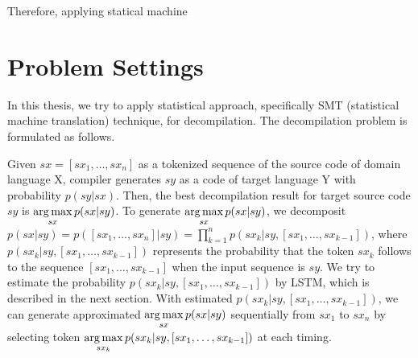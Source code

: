 \documentclass[senior,final,11pt]{iscs-thesis}
\newcommand{\argmax}{\mathop{\rm arg\,max}\limits}
\begin{document}
Therefore, applying statical machine 
















\section{Problem Settings}

In this thesis, we try to apply statistical approach, specifically SMT (statistical machine translation) technique, for decompilation.
The decompilation problem is formulated as follows. 

Given $sx = [sx_1, \dots, sx_n] $ as a tokenized sequence of the source code of domain language X, compiler generates $sy$ as a code of target language Y with probability $p(sy|sx)$.
Then, the best decompilation result for target source code $sy$ is $ \argmax_{sx} p(sx|sy)$. 
To generate $ \argmax_{sx} p(sx|sy)$, we decomposit $ p(sx|sy) = p([sx_1, \dots, sx_n] |sy) = \prod_{k=1}^{n} p(sx_k|sy,[sx_1,\dots,sx_{k-1}]) $,
where $ p(sx_k|sy,[sx_1,\dots,sx_{k-1}]) $ represents the probability that the token $ sx_k $ follows to the sequence $ [sx_1,\dots,sx_{k-1}] $ 
when the input sequence is $ sy $. 
We try to estimate the probability $ p(sx_k|sy,[sx_1,\dots,sx_{k-1}]) $ by LSTM, which is described in the next section.
With estimated $ p(sx_k|sy,[sx_1,\dots,sx_{k-1}]) $, we can generate approximated $ \argmax_{sx} p(sx|sy)$ sequentially from $sx_1$ to $sx_n$ by selecting token $ \argmax_{sx_{k}} p(sx_k|sy,[sx_1,\dots,sx_{k-1}]) $ at each timing.
\end{document}
